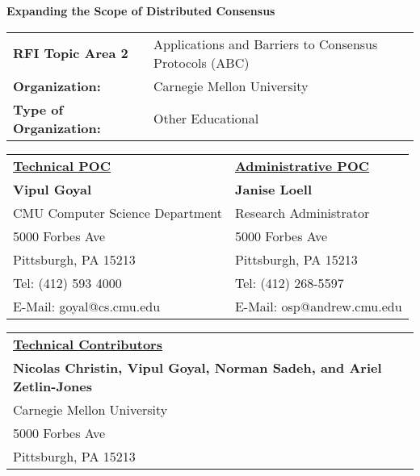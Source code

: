 \begin{center}
  \textbf{Expanding the Scope of Distributed Consensus}
\end{center}

\begin{center}
\begin{tabular}{p{3in}p{3in}}
  \textbf{RFI Topic Area 2} & Applications and Barriers to Consensus Protocols (ABC) \\
   \textbf{Organization:} & Carnegie Mellon University \\
  \textbf{Type of Organization: } & Other Educational \\
\end{tabular}
\end{center}


\begin{center}
\begin{tabular}{p{3in}p{3in}}
  \textbf{\underline{Technical POC}} & \textbf{\underline{Administrative POC}} \\
  \textbf{Vipul Goyal} & \textbf{Janise Loell} \\
  CMU Computer Science Department & Research Administrator\\
  5000 Forbes Ave & 5000 Forbes Ave \\
  Pittsburgh, PA 15213 & Pittsburgh, PA 15213 \\
  Tel: (412) 593 4000 & Tel:  (412) 268-5597 \\
  E-Mail: goyal@cs.cmu.edu & E-Mail: osp@andrew.cmu.edu\\
\end{tabular}
\end{center}

\begin{center}
\begin{tabular}{p{3in}p{3in}}
  \textbf{\underline{Technical Contributors}} & ~ \\
  \textbf{Nicolas Christin, Vipul Goyal, Norman Sadeh, and Ariel Zetlin-Jones} & \\
  Carnegie Mellon University & \\
  5000 Forbes Ave & \\
  Pittsburgh, PA 15213 & \\
\end{tabular}
\end{center}




\newpage

